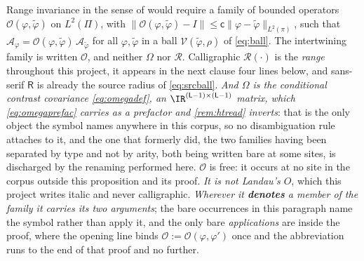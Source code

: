 \begin{proposition}\label{prp:norangeinv}
Range invariance in the sense of \citet[(2.6)--(2.7)]{hanke1995} would require a family of bounded
operators $\mathcal O(\varphi,\tilde\varphi)$ on $L^{2}(\Pi)$, with
$\|\mathcal O(\varphi,\tilde\varphi)-I\|\le\mathsf c\|\varphi-\tilde\varphi\|_{L^{2}(\pi)}$, such that
$\hat{\mathcal A}_\varphi=\mathcal O(\varphi,\tilde\varphi)\,\hat{\mathcal A}_{\tilde\varphi}$ for all
$\varphi,\tilde\varphi$ in a ball $\mathcal V(\tilde\varphi,\rho)$ of \eqref{eq:ball}.
The intertwining family is written $\mathcal O$, and neither $\Omega$ nor $\mathcal R$.
Calligraphic $\mathcal R(\cdot)$
is the \emph{range} throughout this project, it appears in the next clause four lines below, and
sans-serif $\mathsf R$ is already the source radius of \eqref{eq:srcball}. \emph{And $\Omega$ is the
conditional contrast covariance \eqref{eq:omegadef}, an $\IR^{(\mathsf L-1)\times(\mathsf L-1)}$
matrix, which \eqref{eq:omegaprefac} carries as a prefactor and \cref{rem:htread} inverts}: that is the
only object the symbol names anywhere in this corpus, so no disambiguation rule attaches to it, and the
one that formerly did, the two families having been separated by type and not by arity, both being
written bare at some sites, is discharged by the renaming performed here.
$\mathcal O$ is free: it occurs at no site in the
corpus outside this proposition and its proof. \emph{It is not Landau's $O$}, which this project writes
italic and never calligraphic. \emph{Wherever it \textbf{denotes} a member of the family it carries its
two arguments}; the bare occurrences in this paragraph name the symbol rather than apply it, and the only
bare \emph{applications} are inside the proof,
where the opening line binds $\mathcal O:=\mathcal O(\varphi,\varphi')$ once and the abbreviation runs to
the end of that proof and no further.
%

\end{proposition}
